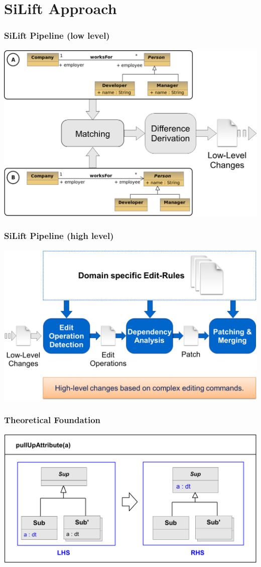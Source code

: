 \section{SiLift Approach}

\begin{frame}
  \frametitle{SiLift Pipeline (low level)}
  \begin{center}
  \includegraphics[scale=0.45]{images/pipeline_low-level}
  \end{center}
\end{frame}

\begin{frame}
  \frametitle{SiLift Pipeline (high level)}
  \begin{center}
  \includegraphics[scale=0.45]{images/pipeline_high-level}
  \end{center}
\end{frame}

\begin{frame}
  \frametitle{Theoretical Foundation}
  \begin{center}
  \includegraphics[scale=0.4]{images/graph_theory}
  \end{center}
\end{frame}

